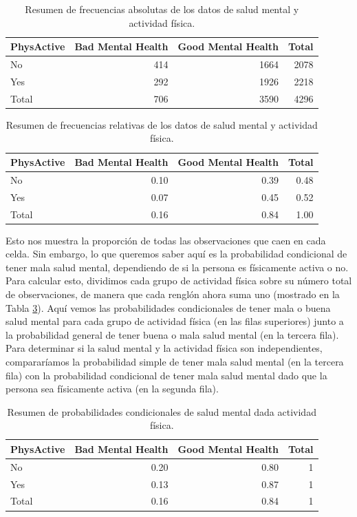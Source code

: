 \documentclass[
  12pt,
]{book}
\begin{document}
\begin{table}

\caption{\label{tab:mhCounts}Resumen de frecuencias absolutas de los datos de salud mental y actividad física.}
\centering
\begin{tabular}[t]{l|r|r|r}
\hline
PhysActive & Bad Mental Health & Good Mental Health & Total\\
\hline
No & 414 & 1664 & 2078\\
\hline
Yes & 292 & 1926 & 2218\\
\hline
Total & 706 & 3590 & 4296\\
\hline
\end{tabular}
\end{table}

\begin{table}

\caption{\label{tab:mhProps}Resumen de frecuencias relativas de los datos de salud mental y actividad física.}
\centering
\begin{tabular}[t]{l|r|r|r}
\hline
PhysActive & Bad Mental Health & Good Mental Health & Total\\
\hline
No & 0.10 & 0.39 & 0.48\\
\hline
Yes & 0.07 & 0.45 & 0.52\\
\hline
Total & 0.16 & 0.84 & 1.00\\
\hline
\end{tabular}
\end{table}

Esto nos muestra la proporción de todas las observaciones que caen en cada celda. Sin embargo, lo que queremos saber aquí es la probabilidad condicional de tener mala salud mental, dependiendo de si la persona es físicamente activa o no. Para calcular esto, dividimos cada grupo de actividad física sobre su número total de observaciones, de manera que cada renglón ahora suma uno (mostrado en la Tabla \ref{tab:condProb}). Aquí vemos las probabilidades condicionales de tener mala o buena salud mental para cada grupo de actividad física (en las filas superiores) junto a la probabilidad general de tener buena o mala salud mental (en la tercera fila). Para determinar si la salud mental y la actividad física son independientes, compararíamos la probabilidad simple de tener mala salud mental (en la tercera fila) con la probabilidad condicional de tener mala salud mental dado que la persona sea físicamente activa (en la segunda fila).

\begin{table}

\caption{\label{tab:condProb}Resumen de probabilidades condicionales de salud mental dada actividad física.}
\centering
\begin{tabular}[t]{l|r|r|r}
\hline
PhysActive & Bad Mental Health & Good Mental Health & Total\\
\hline
No & 0.20 & 0.80 & 1\\
\hline
Yes & 0.13 & 0.87 & 1\\
\hline
Total & 0.16 & 0.84 & 1\\
\hline
\end{tabular}
\end{table}
\end{document}
